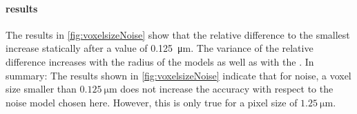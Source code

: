 \paragraph{results}
The results  in \cref{fig:voxelsizeNoise} show that the relative difference to the smallest \voxelsize{} increase statically after a value of \SI{0.125}{\micro\meter}.
The variance of the relative difference increases with the radius of the models as well as with the \voxelsize{}.
% 
In summary:
The results shown in \cref{fig:voxelsizeNoise} indicate that for noise, a voxel size smaller than $\SI{0.125}{\micro\meter}$ does not increase the accuracy with respect to the noise model chosen here.
However, this is only true for a pixel size of $\SI{1.25}{\micro\meter}$.
% 
% 
% 
